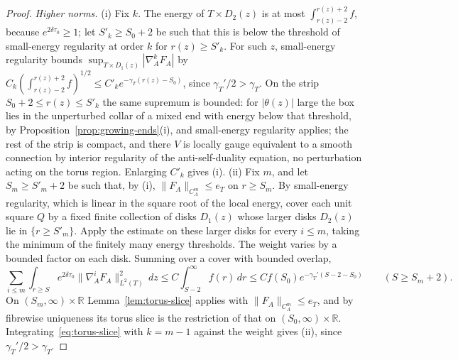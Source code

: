 \documentclass[11pt]{amsart}
\theoremstyle{definition}
\theoremstyle{remark}
\theoremstyle{plain}
\numberwithin{equation}{section}
\newcommand{\RR}{\mathbb{R}}
\begin{document}
\begin{proof}
\emph{Higher norms.} (i) Fix $k$. The energy of $T\times D_2(z)$ is at most
$\int_{r(z)-2}^{r(z)+2}f$, because $e^{2\delta\tau_0}\ge1$; let $S'_k\ge S_0+2$ be such that this is
below the threshold of small-energy regularity at order $k$ for $r(z)\ge S'_k$. For such $z$,
small-energy regularity bounds $\sup_{T\times D_1(z)}|\nabla^k_AF_A|$ by
$C_k(\int_{r(z)-2}^{r(z)+2}f)^{1/2}\le C'_ke^{-\gamma_T(r(z)-S_0)}$, since $\gamma_T'/2>\gamma_T$. On the
strip $S_0+2\le r(z)\le S'_k$ the same supremum is bounded: for $|\theta(z)|$ large the box lies
in the unperturbed collar of a mixed end with energy below that threshold, by
Proposition~\ref{prop:growing-ends}(i), and small-energy regularity applies; the rest of the
strip is compact, and there $V$ is locally gauge equivalent to a smooth connection by interior
regularity of the anti-self-duality equation, no perturbation acting on the torus region.
Enlarging $C'_k$ gives (i). (ii) Fix $m$, and let $S_m\ge S'_m+2$ be such that, by (i),
$\|F_A\|_{C^m_A}\le e_T$ on $r\ge S_m$. By small-energy regularity, which is linear in the square
root of the local energy, cover each unit square $Q$ by a fixed
finite collection of disks $D_1(z)$ whose larger disks $D_2(z)$
lie in $\{r\ge S'_m\}$. Apply the estimate on these larger disks
for every $i\le m$, taking the minimum of the finitely many energy
thresholds. The weight varies by a bounded factor on each disk.
Summing over a cover with bounded overlap,
\[
\sum_{i\le m}\int_{r\ge S}e^{2\delta\tau_0}\|\nabla_A^iF_A\|^2_{L^2(T)}\,dz
\le C\int_{S-2}^\infty f(r)\,dr\le Cf(S_0)e^{-\gamma_T'(S-2-S_0)}\qquad(S\ge S_m+2) .
\]
On $(S_m,\infty)\times\RR$ Lemma~\ref{lem:torus-slice} applies with $\|F_A\|_{C^m_A}\le e_T$, and by
fibrewise uniqueness its torus slice is the restriction of that on $(S_0,\infty)\times\RR$.
Integrating~\eqref{eq:torus-slice} with $k=m-1$ against the weight gives (ii), since
$\gamma_T'/2>\gamma_T$.
\end{proof}
\end{document}
